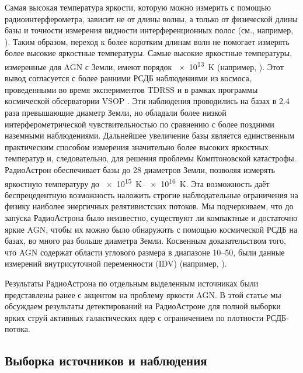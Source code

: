Самая высокая температура яркости, которую можно измерить с помощью радиоинтерферометра, зависит не
от длины волны, а только от физической длины базы и точности измерения видности интерференционных
полос (см., например, \cite{Kovalev_2005}). Таким образом, переход к более коротким длинам волн не
помогает измерять более высокие яркостные температуры. Самые высокие яркостные температуры,
измеренные для AGN с Земли, имеют порядок \SI{e13}{\kelvin} (например,
\cite{Kovalev_2005,Lisakov_2017}). Этот вывод согласуется с более ранними РСДБ наблюдениями из
космоса, проведенными во время экспериментов TDRSS \cite{Levy_1989,Linfield_1989,Linfield_1990} и в
рамках программы космической обсерватории VSOP \cite{Frey_2000,Horiuchi_2004,Dodson_2008}. Эти
наблюдения проводились на базах в 2.4 раза превышающие диаметр Земли, но обладали более низкой
интерферометрической чувствительностью по сравнению с более поздними наземными наблюдениями.
Дальнейшее увеличение базы является единственным практическим способом измерения значительно более
высоких яркостных температур и, следовательно, для решения проблемы Комптоновской катастрофы.
РадиоАстрон обеспечивает базы до 28 диаметров Земли, позволяя измерять яркостную температуру до
\SIrange{e15}{e16}{\kelvin}. Эта возможность даёт беспрецедентную возможность наложить строгие
наблюдательные ограничения на физику наиболее энергичных релятивистских потоков. Мы подчеркиваем,
что до запуска РадиоАстрона было неизвестно, существуют ли компактные и достаточно яркие AGN, чтобы
их можно было обнаружить с помощью космической РСДБ на базах, во много раз больше диаметра Земли.
Косвенным доказательством того, что AGN содержат области углового размера в диапазоне
\SIrange{10}{50}{\uas}, были данные измерений внутрисуточной переменности (IDV) (например,
\cite{Lovell_2008}).

Результаты РадиоАстрона по отдельным выделенным источниках были представлены ранее
\cite{Kovalev_2016,Edwards_2017,Pilipenko_2018,Kutkin_2018} с акцентом на проблему яркости AGN. В
этой статье мы обсуждаем результаты детектирований на РадиоАстроне для полной выборки ярких
струй активных галактических ядер с ограничением по плотности РСДБ-потока.

\subsection{Выборка источников и наблюдения}

